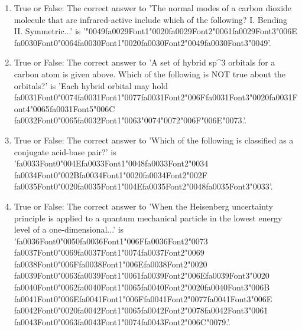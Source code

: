 \documentclass[12pt]{article}
\begin{document}
\begin{enumerate}[label=\arabic*.]
\item True or False: The correct answer to 'The normal modes of a carbon dioxide molecule that are infrared-active include which of the following? I. Bending II. Symmetric...' is '{\char"0049}{\csname fa0029Font1\endcsname\char"0020}{\csname fa0029Font2\endcsname\char"0061}{\csname fa0029Font3\endcsname\char"006E} {\csname fa0030Font0\endcsname\char"0064}{\csname fa0030Font1\endcsname\char"0020}{\csname fa0030Font2\endcsname\char"0049}{\csname fa0030Font3\endcsname\char"0049}'.
\item True or False: The correct answer to 'A set of hybrid sp\^{}3 orbitals for a carbon atom is given above. Which of the following is NOT true about the orbitals?' is 'Each hybrid orbital may hold {\csname fa0031Font0\endcsname\char"0074}{\csname fa0031Font1\endcsname\char"0077}{\csname fa0031Font2\endcsname\char"006F}{\csname fa0031Font3\endcsname\char"0020}{\csname fa0031Font4\endcsname\char"0065}{\csname fa0031Font5\endcsname\char"006C} {\csname fa0032Font0\endcsname\char"0065}{\csname fa0032Font1\endcsname\char"0063}{\char"0074}{\char"0072}{\char"006F}{\char"006E}{\char"0073}.'.
\item True or False: The correct answer to 'Which of the following is classified as a conjugate acid-base pair?' is '{\csname fa0033Font0\endcsname\char"004E}{\csname fa0033Font1\endcsname\char"0048}{\csname fa0033Font2\endcsname\char"0034} {\csname fa0034Font0\endcsname\char"002B}{\csname fa0034Font1\endcsname\char"0020}{\csname fa0034Font2\endcsname\char"002F} {\csname fa0035Font0\endcsname\char"0020}{\csname fa0035Font1\endcsname\char"004E}{\csname fa0035Font2\endcsname\char"0048}{\csname fa0035Font3\endcsname\char"0033}'.
\item True or False: The correct answer to 'When the Heisenberg uncertainty principle is applied to a quantum mechanical particle in the lowest energy level of a one-dimensional...' is '{\csname fa0036Font0\endcsname\char"0050}{\csname fa0036Font1\endcsname\char"006F}{\csname fa0036Font2\endcsname\char"0073} {\csname fa0037Font0\endcsname\char"0069}{\csname fa0037Font1\endcsname\char"0074}{\csname fa0037Font2\endcsname\char"0069} {\csname fa0038Font0\endcsname\char"006F}{\csname fa0038Font1\endcsname\char"006E}{\csname fa0038Font2\endcsname\char"0020} {\csname fa0039Font0\endcsname\char"0063}{\csname fa0039Font1\endcsname\char"0061}{\csname fa0039Font2\endcsname\char"006E}{\csname fa0039Font3\endcsname\char"0020} {\csname fa0040Font0\endcsname\char"0062}{\csname fa0040Font1\endcsname\char"0065}{\csname fa0040Font2\endcsname\char"0020}{\csname fa0040Font3\endcsname\char"006B} {\csname fa0041Font0\endcsname\char"006E}{\csname fa0041Font1\endcsname\char"006F}{\csname fa0041Font2\endcsname\char"0077}{\csname fa0041Font3\endcsname\char"006E} {\csname fa0042Font0\endcsname\char"0020}{\csname fa0042Font1\endcsname\char"0065}{\csname fa0042Font2\endcsname\char"0078}{\csname fa0042Font3\endcsname\char"0061} {\csname fa0043Font0\endcsname\char"0063}{\csname fa0043Font1\endcsname\char"0074}{\csname fa0043Font2\endcsname\char"006C}{\char"0079}.'.

\end{enumerate}
\end{document}
